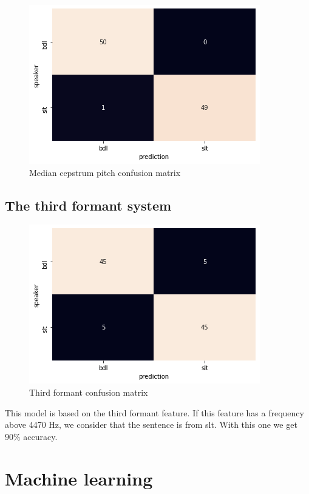 \documentclass[]{article}
\begin{document}
\begin{figure}[H]
    \centering
    \caption{\label{confusion2}Median cepstrum pitch confusion matrix}
    \includegraphics[scale=0.5]{images/confusion2.png}
\end{figure}

\subsection{The third formant system}

\begin{figure}[H]
    \centering
    \caption{\label{confusion3}Third formant confusion matrix}
    \includegraphics[scale=0.5]{images/confusion3.png}
\end{figure}

This model is based on the third formant feature. If this feature has a frequency above 4470 Hz, 
we consider that the sentence is from slt. With this one we get $90\%$ accuracy.

\section{Machine learning}
\end{document}
